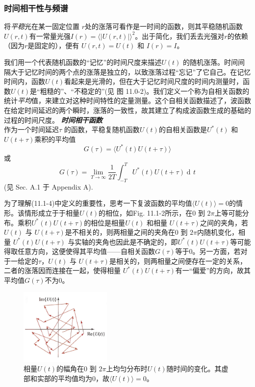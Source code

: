 \documentclass[UTF8]{ctexart}
\numberwithin{figure}{subsection}
\numberwithin{table}{subsection}
\DeclareMathOperator\dif{d\!}
\begin{document}
\bigbreak\begingroup
\color{ksc}
\subsubsection{时间相干性与频谱}
\endgroup
将\textsl{平稳}光在某一固定位置 $ r $处的涨落可看作是一时间的函数，则其平稳随机函数$ U(r,t) $有一常量光强$ I(r) = \langle \lvert U(r,t) \rvert \rangle ^2 $。出于简化，我们丢去光强对$ r $的依赖（因为$ r $是固定的），便有 $ U(r,t) = U(t) $ 和 $ I(r)=I $。
\par  我们用一个代表随机函数的“记忆”的时间尺度来描述$ U(t) $ 的随机涨落。时间间隔大于记忆时间的两个点的涨落是独立的，以致涨落过程“忘记”了它自己。在记忆时间内，函数$ U(t) $看起来是光滑的，但在大于记忆时间尺度的时间内测量时，函数$ U(t) $是“粗糙的”、“不稳定的”(见 图 11.0-2)。我们定义一个称为自相关函数的统计\textsl{平均}值，来建立对这种时间特性的定量测量。这个自相关函数描述了，波函数在给定时间延迟的两个瞬时，涨落的一致性，故其建立了构成波函数生成的基础的过程的时间尺度。
\bigbreak\noindent\textcolor{ksc}{\textbf{\textsl{时间相干函数}}}\\
作为一个时间延迟$ \tau $ 的函数，平稳复随机函数$ U(t)  $的自相关函数是$ U^\ast (t) $ 和 $ U(t+\tau) $乘积的平均值
\begin{equation}
G(\tau) = \langle U^\ast (t)U(t+\tau) \rangle
\end{equation}
或
\begin{equation}
G(\tau) = \lim_{T\to\infty}\frac{1}{2T} \int_{-T}^T U^\ast (t)U(t+\tau) \dif t
\end{equation}
(见 Sec. A.1 于 Appendix A).
\par 为了理解(11.1-4)中定义的重要性，思考一下复波函数的平均值$\langle U(t) \rangle = 0 $的情形。该情形成立于于相量$U(t)$的相位，如Fig. 11.1-2所示，在0 到 $ 2\pi $上等可能分布。乘积$ U^\ast (t)U(t+\tau) $的相位是相量$ U(t) $ 和相量 $ U(t+\tau) $之间的夹角，若$ U(t) $ 与 $ U(t+\tau) $是不相关的，则两相量之间的夹角在0 到 $ 2\pi $内随机变化，相量 $ U^\ast (t)U(t+\tau) $ 与实轴的夹角也因此是不确定的，即$ U^\ast (t)U(t+\tau) $等可能得取任意方向，这便使得其平均值——自相关函数$ G(\tau) $等于0。另一方面，若对于一给定的$\tau$，$ U(t) $ 与 $ U(t+\tau) $是相关的，则两相量之间便存在一定的关系，二者的涨落因而连接在一起，使得相量 $ U^\ast (t)U(t+\tau) $有一“偏爱”的方向，故其平均值$ G(\tau) $不为0。
\begin{figure}[ht]
\centering
\includegraphics[width=0.4\textwidth]{11_1_2.PNG}
\caption{相量$ U(t) $的幅角在0 到 $ 2\pi $上均匀分布时$ U(t) $随时间的变化。其虚部和实部的平均值均为0，故$ \langle U(t) \rangle = 0 $。}
\label{fig: 11_1_2}
\end{figure}
\end{document}
